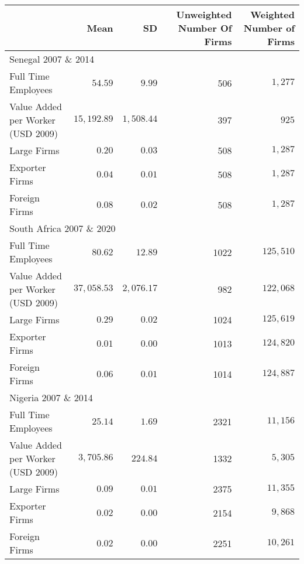 \begin{longtable}{lrrrr}
\toprule
  & Mean & SD & Unweighted Number Of Firms & Weighted Number of Firms \\ 
\midrule
\multicolumn{5}{l}{Senegal 2007 \& 2014} \\ 
\midrule
Full Time Employees & $54.59$ & $9.99$ & 506 & $1,277$ \\ 
Value Added per Worker (USD 2009) & $15,192.89$ & $1,508.44$ & 397 & $925$ \\ 
Large Firms & $0.20$ & $0.03$ & 508 & $1,287$ \\ 
Exporter Firms & $0.04$ & $0.01$ & 508 & $1,287$ \\ 
Foreign Firms & $0.08$ & $0.02$ & 508 & $1,287$ \\ 
\midrule
\multicolumn{5}{l}{South Africa 2007 \& 2020} \\ 
\midrule
Full Time Employees & $80.62$ & $12.89$ & 1022 & $125,510$ \\ 
Value Added per Worker (USD 2009) & $37,058.53$ & $2,076.17$ & 982 & $122,068$ \\ 
Large Firms & $0.29$ & $0.02$ & 1024 & $125,619$ \\ 
Exporter Firms & $0.01$ & $0.00$ & 1013 & $124,820$ \\ 
Foreign Firms & $0.06$ & $0.01$ & 1014 & $124,887$ \\ 
\midrule
\multicolumn{5}{l}{Nigeria 2007 \& 2014} \\ 
\midrule
Full Time Employees & $25.14$ & $1.69$ & 2321 & $11,156$ \\ 
Value Added per Worker (USD 2009) & $3,705.86$ & $224.84$ & 1332 & $5,305$ \\ 
Large Firms & $0.09$ & $0.01$ & 2375 & $11,355$ \\ 
Exporter Firms & $0.02$ & $0.00$ & 2154 & $9,868$ \\ 
Foreign Firms & $0.02$ & $0.00$ & 2251 & $10,261$ \\ 
\bottomrule
\end{longtable}

